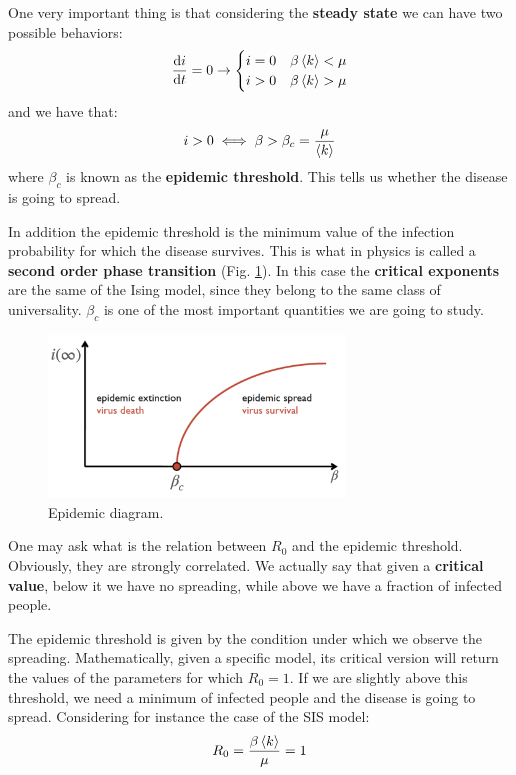 \documentclass[../main/main.tex]{subfiles}
\begin{document}
One very important thing is that considering the \textbf{steady state} we can have two possible behaviors:
\begin{equation*}
  \dv{i}{t} = 0 \rightarrow  \begin{cases}
   i=0 & \beta \expval{k} < \mu  \\
   i>0 & \beta \expval{k} > \mu
  \end{cases}
\end{equation*}
and we have that:
\begin{equation}
  i>0 \iff \beta > \beta_c = \frac{\mu }{ \expval{k} }
\end{equation}
where $\beta_c$ is known as the \textbf{epidemic threshold}. This tells us whether the disease is going to spread.

In addition the epidemic threshold is the minimum value of the infection probability for which the disease survives. This is what in physics is called a \textbf{second order phase transition} (Fig. \ref{fig:3_5}). In this case the \textbf{critical exponents} are the same of the Ising model, since they belong to the same class of universality. $\beta_c$ is one of the most important quantities we are going to study.

\begin{figure}[h!]
\centering
\includegraphics[width=0.7\textwidth]{../lessons/image/03/5.png}
\caption{\label{fig:3_5} Epidemic diagram.}
\end{figure}

One may ask what is the relation between \( R_0 \) and the epidemic threshold. Obviously, they are strongly correlated. We actually say that given a \textbf{critical value}, below it we have no spreading, while above we have a fraction of infected people.

The epidemic threshold is given by the condition under which we observe the spreading. Mathematically, given a specific model, its critical version will return the values of the parameters for which $ R_0 = 1 $. If we are slightly above this threshold, we need a minimum of infected people and the disease is going to spread. Considering for instance the case of the SIS model:
\begin{equation}
  R_0 = \frac{\beta \expval{k} }{\mu } = 1
\end{equation}
\end{document}
